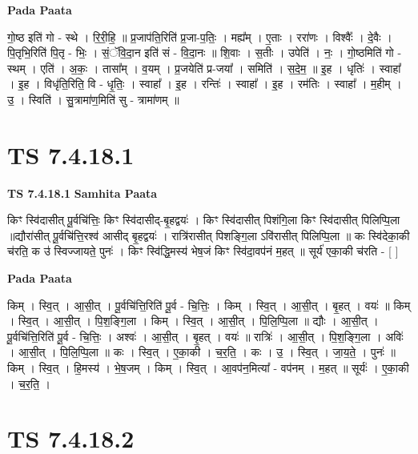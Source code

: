 \documentclass[17pt]{extarticle}
\begin{document}
\textbf{Pada Paata} \newline

गो॒ष्ठ इति॑ गो - स्थे । रि॒री॒हि॒ ॥ प्र॒जाप॑ति॒रिति॑ प्र॒जा-प॒तिः॒ । मह्य᳚म् । ए॒ताः । ररा॑णः । विश्वैः᳚ । दे॒वैः । पि॒तृभि॒रिति॑ पि॒तृ - भिः॒ । सं॒ॅवि॒दा॒न इति॑ सं - वि॒दा॒नः ॥ शि॒वाः । स॒तीः । उपेति॑ । नः॒ । गो॒ष्ठमिति॑ गो - स्थम् । एति॑ । अ॒कः॒ । तासा᳚म् । व॒यम् । प्र॒जयेति॑ प्र-जया᳚ । समिति॑ । स॒दे॒म॒ ॥ इ॒ह । धृतिः॑ । स्वाहा᳚ । इ॒ह । विधृ॑ति॒रिति॒ वि - धृ॒तिः॒ । स्वाहा᳚ । इ॒ह । रन्तिः॑ । स्वाहा᳚ । इ॒ह । रम॑तिः । स्वाहा᳚ । म॒हीम् । उ॒ । स्विति॑ । सु॒त्रामा॑ण॒मिति॑ सु - त्रामा॑णम् ॥  \newline





\section{ TS 7.4.18.1 }

\textbf{TS 7.4.18.1 } \newline
\textbf{Samhita Paata} \newline

किꣳ स्वि॑दासीत् पू॒र्वचि॑त्तिः॒ किꣳ स्वि॑दासीद्-बृ॒हद्वयः॑ । किꣳ स्वि॑दासीत् पिशंगि॒ला किꣳ स्वि॑दासीत् पिलिप्पि॒ला ॥द्यौरा॑सीत् पू॒र्वचि॑त्ति॒रश्व॑ आसीद् बृ॒हद्वयः॑ । रात्रि॑रासीत् पिशङ्गि॒ला ऽवि॑रासीत् पिलिप्पि॒ला ॥ कः स्वि॑देका॒की च॑रति॒ क उ॑ स्विज्जायते॒ पुनः॑ । किꣳ स्वि॑द्धि॒मस्य॑ भेष॒जं किꣳ स्वि॑दा॒वप॑नं म॒हत् ॥ सूर्य॑ एका॒की च॑रति - [  ] \newline

\textbf{Pada Paata} \newline

किम् । स्वि॒त् । आ॒सी॒त् । पू॒र्वचि॑त्ति॒रिति॑ पू॒र्व - चि॒त्तिः॒ । किम् । स्वि॒त् । आ॒सी॒त् । बृ॒हत् । वयः॑ ॥ किम् । स्वि॒त् । आ॒सी॒त् । पि॒श॒ङ्गि॒ला । किम् । स्वि॒त् । आ॒सी॒त् । पि॒लि॒प्पि॒ला ॥ द्यौः । आ॒सी॒त् । पू॒र्वचि॑त्ति॒रिति॑ पू॒र्व - चि॒त्तिः॒ । अश्वः॑ । आ॒सी॒त् । बृ॒हत् । वयः॑ ॥ रात्रिः॑ । आ॒सी॒त् । पि॒श॒ङ्गि॒ला । अविः॑ । आ॒सी॒त् । पि॒लि॒प्पि॒ला ॥ कः । स्वि॒त् । ए॒का॒की । च॒र॒ति॒ । कः । उ॒ । स्वि॒त् । जा॒य॒ते॒ । पुनः॑ ॥ किम् । स्वि॒त् । हि॒मस्य॑ । भे॒ष॒जम् । किम् । स्वि॒त् । आ॒वप॑न॒मित्या᳚ - वप॑नम् । म॒हत् ॥ सूर्यः॑ । ए॒का॒की । च॒र॒ति॒ ।  \newline





\section{ TS 7.4.18.2 }
\end{document}
